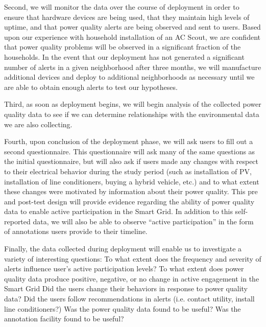 Second, we will monitor the data over the course of deployment in order to ensure that hardware devices are being used, that they maintain high levels of uptime, and that power quality alerts are being observed and sent to users.  Based upon our experience with household installation of an AC Scout, we are confident that power quality problems will be observed in a significant fraction of the households.  In the event that our deployment has not generated a significant number of alerts in a given neighborhood after three months, we will manufacture additional devices and deploy to additional neighborhoods as necessary until we are able to obtain enough alerts to test our hypotheses.

Third, as soon as deployment begins, we will begin analysis of the collected power quality data to see if we can determine relationships with the environmental data we are also collecting. 

Fourth, upon conclusion of the deployment phase, we will ask users to fill out a second questionnaire.  This questionnaire will ask many of the same questions as the initial questionnaire, but will also ask if users made any changes with respect to their electrical behavior during the study period (such as installation of PV, installation of line conditioners, buying a hybrid vehicle, etc.) and to what extent these changes were motivated by information about their power quality.  This pre and post-test design will provide evidence regarding the ability of power quality data to enable active participation in the Smart Grid.  In addition to this self-reported data, we will also be able to observe ``active participation'' in the form of annotations users provide to their timeline.

Finally, the data collected during deployment will enable us to investigate a variety of interesting questions:
To what extent does the frequency and severity of alerts influence user's active participation levels? 
To what extent does power quality data produce positive, negative, or no change in active engagement in the Smart Grid
Did the users change their behaviors in response to power quality data? 
Did the users follow recommendations in alerts (i.e. contact utility, install line conditioners?)
Was the power quality data found to be useful?
Was the annotation facility found to be useful?



















